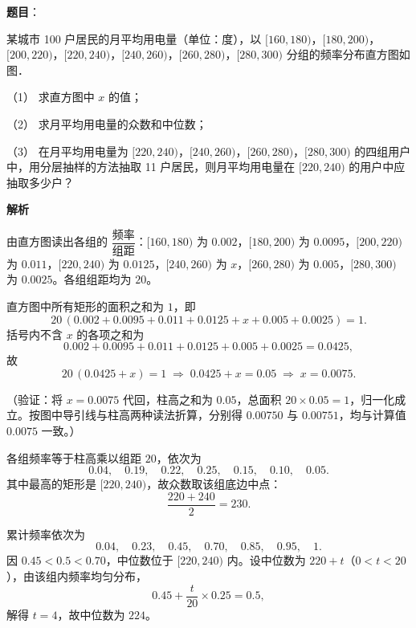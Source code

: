 \begin{answer}

\textbf{题目}：

某城市 100 户居民的月平均用电量（单位：度），以 \([160,180)\)，\([180,200)\)，\([200,220)\)，\([220,240)\)，\([240,260)\)，\([260,280)\)，\([280,300)\) 分组的频率分布直方图如图．
\nopagebreak[4]
\begin{center}\end{center}
\nopagebreak[4]
（1） 求直方图中 \(x\) 的值；

（2） 求月平均用电量的众数和中位数；

（3） 在月平均用电量为 \([220,240)\)，\([240,260)\)，\([260,280)\)，\([280,300)\) 的四组用户中，用分层抽样的方法抽取 11 户居民，则月平均用电量在 \([220,240)\) 的用户中应抽取多少户？

\textbf{解析}

由直方图读出各组的 \(\dfrac{\text{频率}}{\text{组距}}\)：\([160,180)\) 为 \(0.002\)，\([180,200)\) 为 \(0.0095\)，\([200,220)\) 为 \(0.011\)，\([220,240)\) 为 \(0.0125\)，\([240,260)\) 为 \(x\)，\([260,280)\) 为 \(0.005\)，\([280,300)\) 为 \(0.0025\)。各组组距均为 \(20\)。


直方图中所有矩形的面积之和为 \(1\)，即
\nopagebreak[4]
\[
20\,(0.002+0.0095+0.011+0.0125+x+0.005+0.0025)=1.
\]
括号内不含 \(x\) 的各项之和为
\nopagebreak[4]
\[
0.002+0.0095+0.011+0.0125+0.005+0.0025=0.0425,
\]
故
\nopagebreak[4]
\[
20\,(0.0425+x)=1
\;\Longrightarrow\;
0.0425+x=0.05
\;\Longrightarrow\;
x=0.0075.
\]

（验证：将 \(x=0.0075\) 代回，柱高之和为 \(0.05\)，总面积 \(20\times0.05=1\)，归一化成立。按图中导引线与柱高两种读法折算，分别得 \(0.00750\) 与 \(0.00751\)，均与计算值 \(0.0075\) 一致。）


各组频率等于柱高乘以组距 \(20\)，依次为
\nopagebreak[4]
\[
0.04,\quad0.19,\quad0.22,\quad0.25,\quad0.15,\quad0.10,\quad0.05.
\]
其中最高的矩形是 \([220,240)\)，故众数取该组底边中点：
\nopagebreak[4]
\[
\dfrac{220+240}{2}=230.
\]

累计频率依次为
\nopagebreak[4]
\[
0.04,\quad0.23,\quad0.45,\quad0.70,\quad0.85,\quad0.95,\quad1.
\]
因 \(0.45<0.5<0.70\)，中位数位于 \([220,240)\) 内。设中位数为 \(220+t\)（\(0<t<20\)），由该组内频率均匀分布，
\nopagebreak[4]
\[
0.45+\dfrac{t}{20}\times0.25=0.5,
\]
解得 \(t=4\)，故中位数为 \(224\)。


\end{answer}

